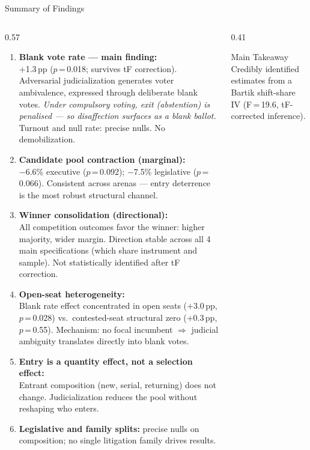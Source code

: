 \documentclass[aspectratio=169,10pt]{beamer}
\begin{document}
\begin{frame}{Summary of Findings}
\begin{columns}[T]
\begin{column}{0.57\textwidth}
\begin{enumerate}
  \item \textbf{Blank vote rate --- main finding:}\\
  $+$1.3\,pp ($p$\,=\,0.018; survives tF correction). Adversarial judicialization generates voter ambivalence, expressed through deliberate blank votes. \emph{Under compulsory voting, exit (abstention) is penalised --- so disaffection surfaces as a blank ballot.} Turnout and null rate: precise nulls. No demobilization.
  \bigskip
  \item \textbf{Candidate pool contraction (marginal):}\\
  $-$6.6\% executive ($p$\,=\,0.092); $-$7.5\% legislative ($p$\,=\,0.066). Consistent across arenas --- entry deterrence is the most robust structural channel.
  \bigskip
  \item \textbf{Winner consolidation (directional):}\\
  All competition outcomes favor the winner: higher majority, wider margin. Direction stable across all 4 main specifications (which share instrument and sample). Not statistically identified after tF correction.
  \bigskip
  \item \textbf{Open-seat heterogeneity:}\\
  Blank rate effect concentrated in open seats ($+$3.0\,pp, $p$\,=\,0.028) vs.\ contested-seat structural zero ($+$0.3\,pp, $p$\,=\,0.55). Mechanism: no focal incumbent $\Rightarrow$ judicial ambiguity translates directly into blank votes.
  \bigskip
  \item \textbf{Entry is a quantity effect, not a selection effect:}\\
  Entrant composition (new, serial, returning) does not change. Judicialization reduces the pool without reshaping who enters.
  \bigskip
  \item \textbf{Legislative and family splits:} precise nulls on composition; no single litigation family drives results.
\end{enumerate}
\end{column}
\begin{column}{0.41\textwidth}
\begin{alertblock}{Main Takeaway}
  Credibly identified estimates from a Bartik shift-share IV (F\,=\,19.6, tF-corrected inference).
  \medskip\\

\end{alertblock}
\end{column}
\end{columns}
\end{frame}
\end{document}
